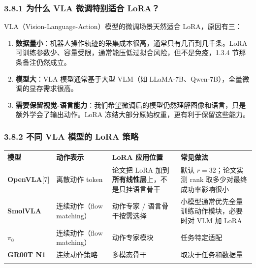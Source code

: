 \documentclass[
  chinese,
]{ctexart}
\providecommand{\tightlist}{%
  \setlength{\itemsep}{0pt}\setlength{\parskip}{0pt}}
\begin{document}
\subsubsection{3.8.1 为什么 VLA 微调特别适合
LoRA？}\label{ux4e3aux4ec0ux4e48-vla-ux5faeux8c03ux7279ux522bux9002ux5408-lora}

VLA（Vision-Language-Action）模型的微调场景天然适合 LoRA，原因有三：

\begin{enumerate}
\def\labelenumi{\arabic{enumi}.}
\tightlist
\item
  \textbf{数据量小}：机器人操作轨迹的采集成本很高，通常只有几百到几千条。LoRA
  可训练参数少、容量受限，通常能压低过拟合风险，但不是免疫，1.3.4
  节那条备注仍然成立。
\item
  \textbf{模型大}：VLA 模型通常基于大型 VLM（如
  LLaMA-7B、Qwen-7B），全量微调的显存需求很高。
\item
  \textbf{需要保留视觉-语言能力}：我们希望微调后的模型仍然理解图像和语言，只是额外学会了输出动作。LoRA
  冻结大部分原始权重，更有利于保留这些能力。
\end{enumerate}

\subsubsection{3.8.2 不同 VLA 模型的 LoRA
策略}\label{ux4e0dux540c-vla-ux6a21ux578bux7684-lora-ux7b56ux7565}

\begin{center}
\begin{tabular}{@{}>{\raggedright\arraybackslash}p{} >{\raggedright\arraybackslash}p{} >{\raggedright\arraybackslash}p{} >{\raggedright\arraybackslash}p{}@{}}
\toprule\noalign{}
模型 & 动作表示 & LoRA 应用位置 & 常见做法 \\
\midrule\noalign{}
\textbf{OpenVLA}{[}7{]} & 离散动作 token & 论文把 LoRA 加到\textbf{所有线性层}上，不是只挂语言骨干 & 默认 \(r=32\)；论文实测 rank 取多少对最终成功率影响很小 \\
\textbf{SmolVLA} & 连续动作（flow matching） & 动作专家 / 语言骨干按需选择 & 小模型通常优先全量训练动作模块，必要时对 VLM 加 LoRA \\
\textbf{\(\pi_0\)} & 连续动作（flow matching） & 动作专家模块 & 任务特定适配 \\
\textbf{GR00T N1} & 连续动作策略 & 多模态骨干 & 取决于任务和数据量 \\
\bottomrule\noalign{}
\end{tabular}
\end{center}
\end{document}
